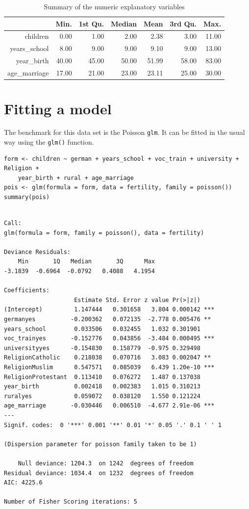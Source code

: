 \documentclass[a4paper,twoside,11pt]{article}
\begin{document}
\begin{table}[ht]
\centering
\begin{tabular}{rrrrrrr}
  \hline
 & Min. & 1st Qu. & Median & Mean & 3rd Qu. & Max. \\ 
  \hline
children & 0.00 & 1.00 & 2.00 & 2.38 & 3.00 & 11.00 \\ 
  years\_school & 8.00 & 9.00 & 9.00 & 9.10 & 9.00 & 13.00 \\ 
  year\_birth & 40.00 & 45.00 & 50.00 & 51.99 & 58.00 & 83.00 \\ 
  age\_marriage & 17.00 & 21.00 & 23.00 & 23.11 & 25.00 & 30.00 \\ 
   \hline
\end{tabular}
\caption{Summary of the numeric explanatory variables} 
\label{tbl:frecnum}
\end{table}




\section{Fitting a model}
\label{sec:org0f503d8}

The benchmark for this data set is the Poisson \texttt{glm}. It can be fitted in the
usual way using the \texttt{glm()} function.
\begin{verbatim}
form <- children ~ german + years_school + voc_train + university + Religion +
    year_birth + rural + age_marriage
pois <- glm(formula = form, data = fertility, family = poisson())
summary(pois)
\end{verbatim}

\label{org06e8a44}
\begin{verbatim}

Call:
glm(formula = form, family = poisson(), data = fertility)

Deviance Residuals: 
    Min       1Q   Median       3Q      Max  
-3.1839  -0.6964  -0.0792   0.4088   4.1954  

Coefficients:
                    Estimate Std. Error z value Pr(>|z|)    
(Intercept)         1.147444   0.301658   3.804 0.000142 ***
germanyes          -0.200362   0.072135  -2.778 0.005476 ** 
years_school        0.033506   0.032455   1.032 0.301901    
voc_trainyes       -0.152776   0.043856  -3.484 0.000495 ***
universityyes      -0.154830   0.158779  -0.975 0.329498    
ReligionCatholic    0.218038   0.070716   3.083 0.002047 ** 
ReligionMuslim      0.547571   0.085039   6.439 1.20e-10 ***
ReligionProtestant  0.113410   0.076272   1.487 0.137038    
year_birth          0.002418   0.002383   1.015 0.310213    
ruralyes            0.059072   0.038120   1.550 0.121224    
age_marriage       -0.030446   0.006510  -4.677 2.91e-06 ***
---
Signif. codes:  0 '***' 0.001 '**' 0.01 '*' 0.05 '.' 0.1 ' ' 1

(Dispersion parameter for poisson family taken to be 1)

    Null deviance: 1204.3  on 1242  degrees of freedom
Residual deviance: 1034.4  on 1232  degrees of freedom
AIC: 4225.6

Number of Fisher Scoring iterations: 5
\end{verbatim}
\end{document}
